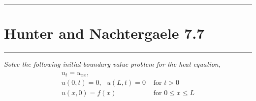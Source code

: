 \documentclass[fontsize=11pt]{article} %
\theoremstyle{plain}
\numberwithin{equation}{section} %
\numberwithin{figure}{section} %
\numberwithin{table}{section} %
\begin{document}
\begin{center}
    \noindent\rule{5cm}{1pt}
\end{center}
\section{\bf Hunter and Nachtergaele 7.7}
\begin{center}
    \noindent\rule{5cm}{1pt}
\end{center}

\emph{Solve the following initial-boundary value problem for the heat equation,}
\begin{align*}
    \begin{array}{ll}
    u_t = u_{xx}, & \\
    u(0, t) = 0,\ \ \ u(L,t) = 0 & \text{ for } t > 0 \\
    u(x, 0) = f(x) & \text{ for } 0 \leq x \leq L
    \end{array}
\end{align*}
\end{document}
